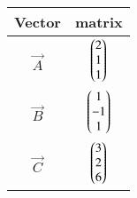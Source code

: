 \begin{tabular}{|c|c|}
\hline
\textbf{Vector} & \textbf{matrix} \\
\hline
$\vec{A}$ & $\begin{pmatrix}2\\1\\1\end{pmatrix}$ \\
\hline
$\vec{B}$ & $\begin{pmatrix}1\\-1\\1\end{pmatrix}$ \\
\hline
$\vec{C}$ & $\begin{pmatrix}3\\2\\6\end{pmatrix}$ \\
\hline
\end{tabular}
